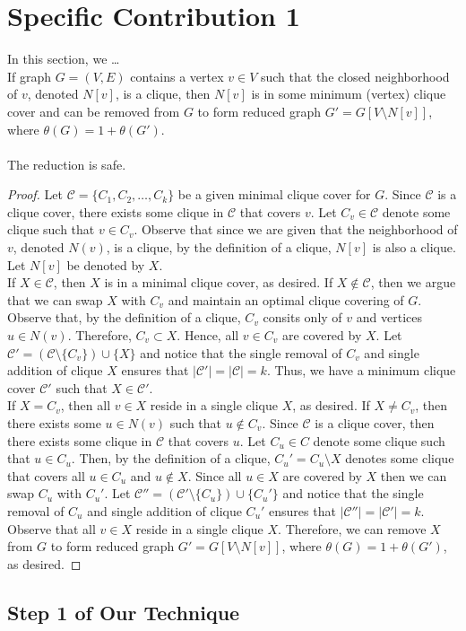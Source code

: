 \documentclass[../techreport.tex]{subfiles}
\begin{document}
\section{Specific Contribution 1}
\label{sec:specific1}
In this section, we \ldots \\

 If graph $G = (V, E)$ contains a vertex $v \in V$ such that the closed neighborhood of $v$, denoted $N[v]$, is a clique, then $N[v]$ is in some minimum (vertex) clique cover and can be removed from $G$ to form reduced graph $G' = G[V \setminus N[v]]$, where $\theta(G) = 1 + \theta(G')$. \\ \\

 The reduction is safe.

\begin{proof}
	Let $\mathcal{C} = \{C_1, C_2, \dots, C_k\}$ be a given minimal clique cover for $G$. Since $\mathcal{C}$ is a clique cover, there exists some clique in $\mathcal{C}$ that covers $v$. Let $C_v \in \mathcal{C}$ denote some clique such that $v \in C_v$. Observe that since we are given that the neighborhood of $v$, denoted $N(v)$, is a clique, by the definition of a clique, $N[v]$ is also a clique. Let $N[v]$ be denoted by $X$. \\

	If $X \in \mathcal{C}$, then $X$ is in a minimal clique cover, as desired. If $X \notin \mathcal{C}$, then we argue that we can swap $X$ with $C_v$ and maintain an optimal clique covering of $G$. \\

	Observe that, by the definition of a clique, $C_v$ consits only of $v$ and vertices $u \in N(v)$. Therefore, $C_v \subset X$. Hence, all $v \in C_v$ are covered by $X$. Let $\mathcal{C'} = (\mathcal{C} \setminus \{C_v\}) \cup \{X\}$ and notice that the single removal of $C_v$ and single addition of clique $X$ ensures that $|\mathcal{C'}| = |\mathcal{C}| = k$. Thus, we have a minimum clique cover $\mathcal{C'}$ such that $X \in \mathcal{C'}$. \\

	If $X = C_v$, then all $v \in X$ reside in a single clique $X$, as desired. If $X \neq C_v$, then there exists some $u \in N(v)$ such that $u \notin C_v$. Since $\mathcal{C}$ is a clique cover, then there exists some clique in $\mathcal{C}$ that covers $u$. Let $C_u \in C$ denote some clique such that $u \in C_u$. Then, by the definition of a clique, $C_u' = C_u \setminus X$ denotes some clique that covers all $u \in C_u$ and $u \notin X$. Since all $u \in X$ are covered by $X$ then we can swap $C_u$ with $C_u'$. Let $\mathcal{C''} = (\mathcal{C'} \setminus \{C_u\}) \cup \{C_u'\}$ and notice that the single removal of $C_u$ and single addition of clique $C_u'$ ensures that $|\mathcal{C''}| = |\mathcal{C'}| = k$. \\

	Observe that all $v \in X$ reside in a single clique $X$. Therefore, we can remove $X$ from $G$ to form reduced graph $G' = G[V \setminus N[v]]$, where $\theta(G) = 1 + \theta(G')$, as desired.
\end{proof}
\subsection{Step 1 of Our Technique}
\lipsum[16]
\end{document}
